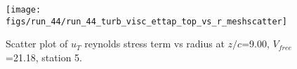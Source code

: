 \begin{figure}[H]
\centering
\texttt{[image: figs/run\_44/run\_44\_turb\_visc\_ettap\_top\_vs\_r\_meshscatter]}
\caption{Scatter plot of $
u_T$ reynolds stress term vs radius at $z/c$=9.00, $V_{free}$=21.18, station 5.}
\label{fig:run_44_turb_visc_ettap_top_vs_r_meshscatter}
\end{figure}


